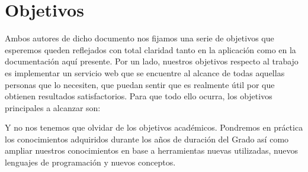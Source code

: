 \section{Objetivos}
Ambos autores de dicho documento nos fijamos una serie de objetivos que esperemos queden reflejados con total claridad tanto en la aplicación como en la documentación aquí presente.
Por un lado, nuestros objetivos respecto al trabajo es implementar un servicio web  que se encuentre al alcance de todas aquellas personas que lo necesiten, que puedan sentir que es realmente útil por que obtienen resultados satisfactorios.
Para que todo ello ocurra, los objetivos principales a alcanzar son:
Y no nos tenemos que olvidar de los objetivos académicos. Pondremos en práctica los conocimientos adquiridos durante los años de duración del Grado así como ampliar nuestros conocimientos en base a herramientas nuevas utilizadas, nuevos lenguajes de programación y nuevos conceptos.







